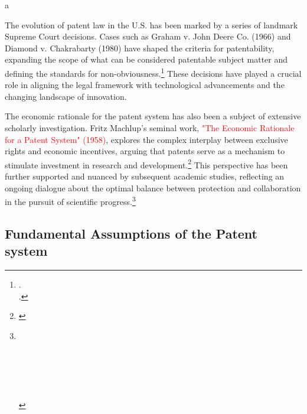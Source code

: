 a\documentclass{article}[10pt]
\begin{document}
The evolution of patent law in the U.S. has been marked by a series of landmark Supreme Court decisions. Cases such as Graham v. John Deere Co. (1966) and Diamond v. Chakrabarty (1980) have shaped the criteria for patentability, expanding the scope of what can be considered patentable subject matter and defining the standards for non-obviousness.\footnote{
    \cite{1966graham}.\\
    \indent\indent \cite{1980diamond}.}
These decisions have played a crucial role in aligning the legal framework with technological advancements and the changing landscape of innovation.\par

The economic rationale for the patent system has also been a subject of extensive scholarly investigation. Fritz Machlup's seminal work, \textcolor{red}{"The Economic Rationale for a Patent System" (1958)}, explores the complex interplay between exclusive rights and economic incentives, arguing that patents serve as a mechanism to stimulate investment in research and development.\footnote{
    \cite{machlup1958economic}} 
This perspective has been further supported and nuanced by subsequent academic studies, reflecting an ongoing dialogue about the optimal balance between protection and collaboration in the pursuit of scientific progress.\footnote{
    \cite{merges1990complex}\\
    \indent\indent \cite{scotchmer1991standing}\\
    \indent\indent \cite{gallini2002economics}\\
    \indent\indent \cite{heller1998can}\\
    \indent\indent \cite{hall2001patent}\\
    \indent\indent \cite{lemley2007universities}\\
    \indent\indent \cite{bessen2009patent}}

\subsection{Fundamental Assumptions of the Patent system}
\end{document}
